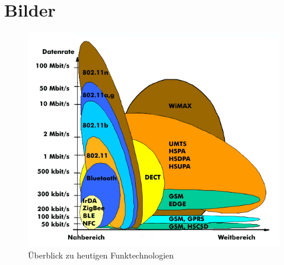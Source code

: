 \renewcommand{\thesection}{\Alph{section}}
\setcounter{figure}{0}
\renewcommand{\thefigure}{\Alph{section}.\arabic{figure}}
\appendix
{}

\captionsetup{list=false}

\section{Bilder}
\begin{figure}[H]
\centering
\includegraphics[scale=1]{Bilder/Funktechnologien.png} 
\caption{Überblick zu heutigen Funktechnologien \cite{FUE}}
\label{fig:FUE}
\end{figure}
